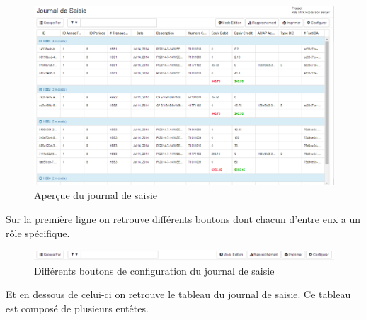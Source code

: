 \documentclass[12pt,a4paper]{report}
\begin{document}
\begin{figure}[h]
\begin{center}
\includegraphics[width=14cm]{pic/JournalSaisie.png}
\end{center}
\caption{Aperçue du journal de saisie}
\label{Aperçue du journal de saisie}
\end{figure}

Sur la première ligne on retrouve différents boutons dont chacun d'entre eux a un rôle spécifique.
\begin{figure}[h]
\begin{center}
\includegraphics[width=14cm]{pic/MenuConfigRepJourn.png}
\end{center}
\caption{Différents boutons de configuration du journal de saisie}
\label{Différents boutons de configuration du journal de saisie}
\end{figure}

Et en dessous de celui-ci on retrouve le tableau du journal de saisie. Ce tableau est composé de plusieurs entêtes. 
\end{document}
